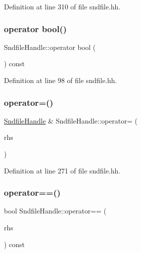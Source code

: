 Definition at line 310 of file sndfile.\+hh.

\mbox{\label{class_sndfile_handle_a7f99c56f1af1f6d74c1312a05aaf1a12}} 
\subsubsection{\texorpdfstring{operator bool()}{operator bool()}}
{\footnotesize\ttfamily Sndfile\+Handle\+::operator bool (\begin{DoxyParamCaption}{ }\end{DoxyParamCaption}) const\hspace{0.3cm}{\ttfamily [inline]}}



Definition at line 98 of file sndfile.\+hh.

\mbox{\label{class_sndfile_handle_af7f77c3dbd655daed9648b702329ca86}} 
\subsubsection{\texorpdfstring{operator=()}{operator=()}}
{\footnotesize\ttfamily \mbox{\hyperlink{class_sndfile_handle}{Sndfile\+Handle}} \& Sndfile\+Handle\+::operator= (\begin{DoxyParamCaption}\item[{const \mbox{\hyperlink{class_sndfile_handle}{Sndfile\+Handle}} \&}]{rhs }\end{DoxyParamCaption})\hspace{0.3cm}{\ttfamily [inline]}}



Definition at line 271 of file sndfile.\+hh.

\mbox{\label{class_sndfile_handle_a37b4778ae0a0e7125f68ea872cecc8e0}} 
\subsubsection{\texorpdfstring{operator==()}{operator==()}}
{\footnotesize\ttfamily bool Sndfile\+Handle\+::operator== (\begin{DoxyParamCaption}\item[{const \mbox{\hyperlink{class_sndfile_handle}{Sndfile\+Handle}} \&}]{rhs }\end{DoxyParamCaption}) const\hspace{0.3cm}{\ttfamily [inline]}}



